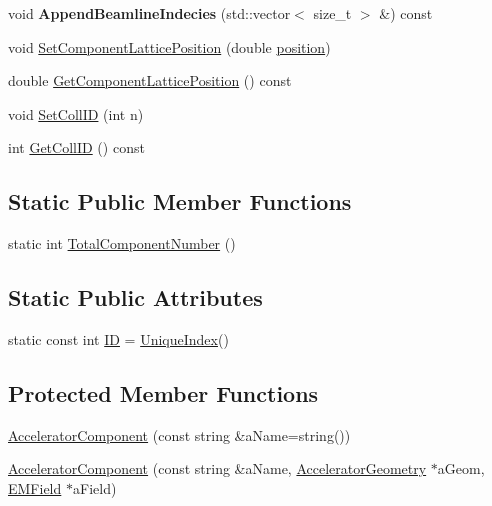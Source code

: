 \begin{DoxyCompactItemize}
void {\bfseries Append\+Beamline\+Indecies} (std\+::vector$<$ size\+\_\+t $>$ \&) const
\item 
void \hyperlink{classAcceleratorComponent_afab772327a61defbc42a91254b79457c}{Set\+Component\+Lattice\+Position} (double \hyperlink{classAcceleratorComponent_a379d5d0bc151e90328e834f520707c7e}{position})
\item 
double \hyperlink{classAcceleratorComponent_a8283a65382ca795b19448448abba245a}{Get\+Component\+Lattice\+Position} () const
\item 
void \hyperlink{classAcceleratorComponent_a83dc19ee2dae64632cc770e6937828bc}{Set\+Coll\+ID} (int n)
\item 
int \hyperlink{classAcceleratorComponent_a6454158847b9cd68e5b9b0272aa19ecd}{Get\+Coll\+ID} () const
\end{DoxyCompactItemize}
\subsection*{Static Public Member Functions}
\begin{DoxyCompactItemize}
\item 
static int \hyperlink{classAcceleratorComponent_a270378decf9c9b7aea618d11d971170f}{Total\+Component\+Number} ()
\end{DoxyCompactItemize}
\subsection*{Static Public Attributes}
\begin{DoxyCompactItemize}
\item 
static const int \hyperlink{classAcceleratorComponent_ad1c205fd2524942f308ac39e37a7d1be}{ID} = \hyperlink{classAcceleratorComponent_aa7ad4d39e1a488b705983842ed1ac784}{Unique\+Index}()
\end{DoxyCompactItemize}
\subsection*{Protected Member Functions}
\begin{DoxyCompactItemize}
\item 
\hyperlink{classAcceleratorComponent_a2027878fd5cd445eea76291f7b33ae29}{Accelerator\+Component} (const string \&a\+Name=string())
\item 
\hyperlink{classAcceleratorComponent_af7b94670ca7939aedc18e10e9cbfadcb}{Accelerator\+Component} (const string \&a\+Name, \hyperlink{classAcceleratorGeometry}{Accelerator\+Geometry} $\ast$a\+Geom, \hyperlink{classEMField}{E\+M\+Field} $\ast$a\+Field)
\end{DoxyCompactItemize}
